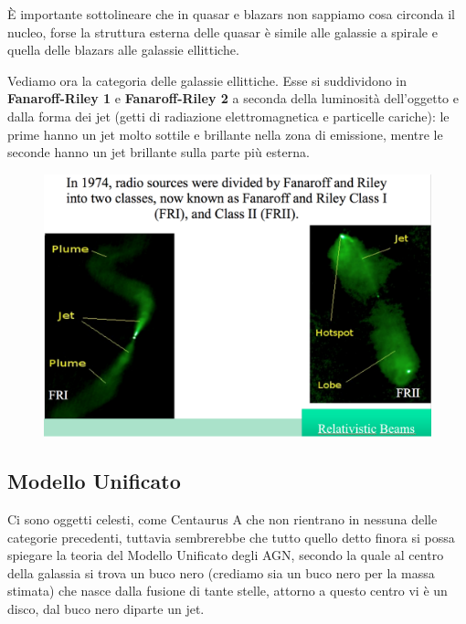È importante sottolineare che in quasar e blazars non sappiamo cosa circonda il nucleo, forse la struttura esterna delle quasar è simile alle galassie a spirale e quella delle blazars alle galassie ellittiche.

Vediamo ora la categoria delle galassie ellittiche. Esse si suddividono in \textbf{Fanaroff-Riley 1} e \textbf{Fanaroff-Riley 2} a seconda della luminosità dell'oggetto e dalla forma dei jet (getti di radiazione elettromagnetica e particelle cariche): le prime hanno un jet molto sottile e brillante nella zona di emissione, mentre le seconde hanno un jet brillante sulla parte più esterna.

\begin{figure}[H]
    \centering
    \includegraphics[width=\textwidth]{immagini_lezioni12-12/49.png}
\end{figure}

\subsection{Modello Unificato}
Ci sono oggetti celesti, come Centaurus A che non rientrano in nessuna delle categorie precedenti, tuttavia sembrerebbe che tutto quello detto finora si possa spiegare la teoria del Modello Unificato degli AGN, secondo la quale al centro della galassia si trova un buco nero (crediamo sia un buco nero per la massa stimata) che nasce dalla fusione di tante stelle, attorno a questo centro vi è un disco, dal buco nero diparte un jet.

